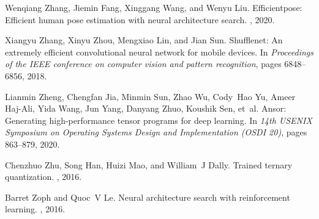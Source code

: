 \documentclass[10pt,twocolumn,letterpaper]{article}
\begin{document}
{\begin{thebibliography}{10}
Wenqiang Zhang, Jiemin Fang, Xinggang Wang, and Wenyu Liu.
\newblock Efficientpose: Efficient human pose estimation with neural
  architecture search.
, 2020.

Xiangyu Zhang, Xinyu Zhou, Mengxiao Lin, and Jian Sun.
\newblock Shufflenet: An extremely efficient convolutional neural network for
  mobile devices.
\newblock In {\em Proceedings of the IEEE conference on computer vision and
  pattern recognition}, pages 6848--6856, 2018.

Lianmin Zheng, Chengfan Jia, Minmin Sun, Zhao Wu, Cody~Hao Yu, Ameer Haj-Ali,
  Yida Wang, Jun Yang, Danyang Zhuo, Koushik Sen, et~al.
\newblock Ansor: Generating high-performance tensor programs for deep learning.
\newblock In {\em 14th USENIX Symposium on Operating Systems Design and
  Implementation (OSDI 20)}, pages 863--879, 2020.

Chenzhuo Zhu, Song Han, Huizi Mao, and William~J Dally.
\newblock Trained ternary quantization.
, 2016.

Barret Zoph and Quoc~V Le.
\newblock Neural architecture search with reinforcement learning.
, 2016.

\end{thebibliography}
 }
\end{document}

